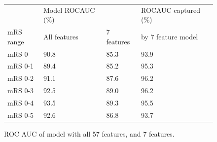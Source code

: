 \begin{figure}[!ht]
    \centering
        \begin{tabular}{lllll}
        \toprule
         & Model ROCAUC (\%) & &ROCAUC captured (\%)\\ 
         mRS range & All features & 7 features & by 7 feature model\\ 
         \midrule
        mRS 0 & 90.8  & 85.3 & 93.9\\ 
        mRS 0-1 & 89.4  & 85.2 & 95.3\\
        mRS 0-2 & 91.1  & 87.6 & 96.2\\
        mRS 0-3 & 92.5  & 89.0 & 96.2\\
        mRS 0-4 & 93.5  & 89.3 & 95.5\\
        mRS 0-5 & 92.6  & 86.8 & 93.7\\
        \bottomrule
        \end{tabular}
      \caption{ROC AUC of model with all 57 features, and 7 features.}
      \label{fig:table_rocauc_feature_selection}

\end{figure}

